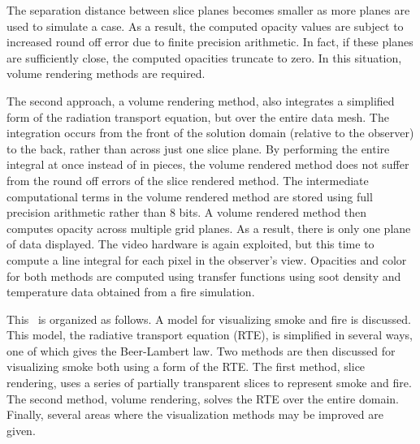 The separation distance between slice planes becomes smaller as more planes are used to simulate a case.  As a result, the computed opacity values are subject to increased round off error due to finite precision arithmetic.  In fact, if these planes are sufficiently close, the computed opacities truncate to zero.   In this situation, volume rendering methods are required.

The second approach, a volume rendering method, also integrates a simplified form of the radiation transport equation, but over the entire data mesh.  The integration occurs from the front of the solution domain (relative to the observer) to the back, rather than across just one slice plane. By performing the entire integral at once instead of in pieces, the volume rendered method does not suffer from the round off errors of the slice rendered method.  The intermediate computational terms in the volume rendered method are stored using full precision arithmetic rather than 8 bits.  A volume rendered method then computes opacity across multiple grid planes.  As a result, there is only one plane of data displayed.  The video hardware is again exploited, but this time to compute a line integral for each pixel in the observer's view.  Opacities and color for both methods are computed using transfer functions using soot density and temperature data obtained from a fire simulation.

This \paper\ is organized as follows.  A model for visualizing smoke and fire is discussed.  This model, the radiative transport equation (RTE), is simplified in several ways, one of which gives the Beer-Lambert law.  Two methods are then discussed for visualizing smoke  both using a form of the RTE.  The first method, slice rendering,  uses a series of partially transparent slices to represent smoke and fire. The second method, volume rendering, solves the RTE over the entire domain. Finally, several areas where the visualization methods may be improved are given.


